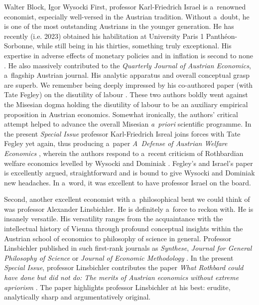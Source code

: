\begin{editorialeng2auth}{Walter Block, Igor Wysocki}
First, professor Karl-Friedrich Israel is a~renowned economist, especially well-versed in the Austrian tradition. Without a~doubt, he is one of the most outstanding Austrians in the younger generation. He has recently (i.e. 2023) obtained his habilitation at University Paris 1 Panthéon-Sorbonne, while still being in his thirties, something truly exceptional. His expertise in adverse effects of monetary policies and in inflation is second to none 
\parencite[][]{israel_monetary_2022}. %
 He also massively contributed to the \textit{Quarterly Journal of Austrian Economics}, a~flagship Austrian journal. His analytic apparatus and overall conceptual grasp are superb. We remember being deeply impressed by his co-authored paper (with Tate Fegley) on the disutility of labour 
\parencite[][]{fegley_disutility_2020}. %
 These two authors boldly went against the Misesian dogma holding the disutility of labour to be an auxiliary empirical proposition in Austrian economics. Somewhat ironically, the authors' critical attempt helped to advance the overall Misesian \textit{a~priori} scientific programme. In the present \textit{Special Issue} professor Karl-Friedrich Isreal joins forces with Tate Fegley yet again, thus producing a~paper \textit{A~Defense of Austrian Welfare Economics} 
\parencite[][]{fegley_defense_2024}, %
 wherein the authors respond to a~recent criticism of Rothbardian welfare economics levelled by Wysocki and Dominiak 
\parencite*[][]{wysocki_how_2023}. %
 Fegley's and Israel's paper is excellently argued, straightforward and is bound to give Wysocki and Dominiak new headaches. In a~word, it was excellent to have professor Israel on the board.



Second, another excellent economist with a~philosophical bent we could think of was professor Alexander Linsbichler. He is definitely a~force to reckon with. He is insanely versatile. His versatility ranges from the acquaintance with the intellectual history of Vienna through profound conceptual insights within the Austrian school of economics to philosophy of science in general. Professor Linsbichler published in such first-rank journals as \textit{Synthese}, \textit{Journal for General Philosophy of Science} or \textit{Journal of Economic Methodology} 
\parencites[][]{linsbichler_austrian_2021}[][]{linsbichler_otto_2023}[][]{linsbichler_otto_2023}. %
 In the present \textit{Special Issue}, professor Linsbichler contributes the paper \textit{What Rothbard could have done but did not do: The merits of Austrian economics without extreme apriorism} 
\parencite*[][]{linsbichler_what_2024}. %
 The paper highlights professor Linsbichler at his best: erudite, analytically sharp and argumentatively original.




\end{editorialeng2auth}
